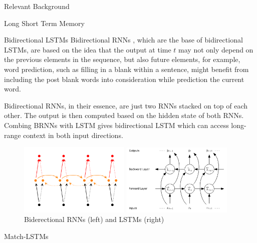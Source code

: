 \documentclass{article}
\begin{document}
\begin{psection}{Relevant Background}
\begin{psubsection}{Long Short Term Memory}
		\begin{pssubsection}{Bidirectional LSTMs}
			Bidirectional RNNs \citep[BRNNs,][]{rnn-blog}, which are the base of bidirectional LSTMs, are based on the idea that the output at time $t$ may not only depend on the previous elements in the sequence, but also future elements, for example, word prediction, such as filling in a blank within a sentence, might benefit from including the post blank words into consideration while prediction the current word.

			Bidirectional RNNs, in their essence, are just two RNNs stacked on top of each other.
			The output is then computed based on the hidden state of both RNNs.
			Combing BRNNs with LSTM gives bidirectional LSTM which can access long-range context in both input directions.

			\begin{figure}[ht!]
				\begin{minipage}{0.47\textwidth}
					\centering
					\includegraphics[width=200px]{includes/bidirectional-rnn.png}
					\caption*{(a) Bidirectional RNN}
				\end{minipage}
				\begin{minipage}{0.47\textwidth}

					\centering
					\includegraphics[width=200px]{includes/bidirectional-lstm.png}
					\caption*{(b) Bidirectional LSTM}
				\end{minipage}
				\caption{Biderectional RNNs (left) and LSTMs (right) }
			\end{figure}

		\end{pssubsection}

		\begin{pssubsection}{Match-LSTMs}


\end{pssubsection}
\end{psubsection}
\end{psection}
\end{document}
